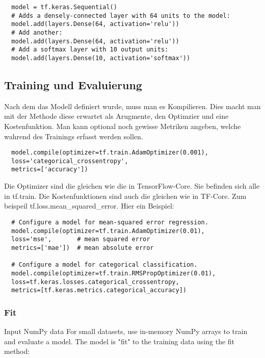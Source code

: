 \begin{verbatim}
  model = tf.keras.Sequential()
  # Adds a densely-connected layer with 64 units to the model:
  model.add(layers.Dense(64, activation='relu'))
  # Add another:
  model.add(layers.Dense(64, activation='relu'))
  # Add a softmax layer with 10 output units:
  model.add(layers.Dense(10, activation='softmax'))
\end{verbatim}


\subsection{Training und Evaluierung}

Nach dem das Modell definiert wurde, muss man es Kompilieren.
Dies macht man mit der Methode  diese erwartet als
Arugmente, den Optimzier und eine Kostenfunktion. Man kann optional noch gewisse
Metriken angeben, welche wahrend des Trainings erfasst werden sollen.
\begin{verbatim}
  model.compile(optimizer=tf.train.AdamOptimizer(0.001),
  loss='categorical_crossentropy',
  metrics=['accuracy'])
\end{verbatim}
Die Optimizer sind die gleichen wie die in TensorFlow-Core. Sie befinden sich
alle in tf.train. Die Kostenfunktionen sind auch die gleichen wie in TF-Core.
Zum beispeil tf.loss.mean\_squared\_error.
\para{}
Hier ein Beispiel:
\begin{verbatim}
  # Configure a model for mean-squared error regression.
  model.compile(optimizer=tf.train.AdamOptimizer(0.01),
  loss='mse',       # mean squared error
  metrics=['mae'])  # mean absolute error

  # Configure a model for categorical classification.
  model.compile(optimizer=tf.train.RMSPropOptimizer(0.01),
  loss=tf.keras.losses.categorical_crossentropy,
  metrics=[tf.keras.metrics.categorical_accuracy])

\end{verbatim}

\subsubsection{Fit}
Input NumPy data
For small datasets, use in-memory NumPy arrays to train and evaluate a model. The model is "fit" to the training data using the fit method:

